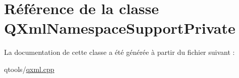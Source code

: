 \hypertarget{class_q_xml_namespace_support_private}{}\section{Référence de la classe Q\+Xml\+Namespace\+Support\+Private}
\label{class_q_xml_namespace_support_private}


La documentation de cette classe a été générée à partir du fichier suivant \+:\begin{DoxyCompactItemize}
\item 
qtools/\hyperlink{qxml_8cpp}{qxml.\+cpp}\end{DoxyCompactItemize}
